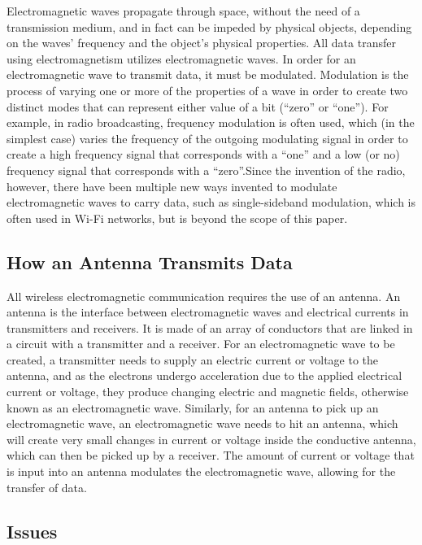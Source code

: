 \documentclass[11pt]{article}
\begin{document}
Electromagnetic waves propagate through space, without the need of a transmission medium, and in fact can be impeded by physical objects, depending on the waves’ frequency and the object's physical properties. 
All data transfer using electromagnetism utilizes electromagnetic waves. In order for an electromagnetic wave to transmit data, it must be modulated. Modulation is the process of varying one or more of the properties of a wave in order to create two distinct modes that can represent either value of a bit (“zero” or “one”). For example, in radio broadcasting, frequency modulation is often used, which (in the simplest case) varies the frequency of the outgoing modulating signal in order to create a high frequency signal that corresponds with a “one” and a low (or no) frequency signal that corresponds with a “zero”.Since the invention of the radio, however, there have been multiple new ways invented to modulate electromagnetic waves to carry data, such as single-sideband modulation, which is often used in Wi-Fi networks, but is beyond the scope of this paper.

\subsection{How an Antenna Transmits Data}

All wireless electromagnetic communication requires the use of an antenna. An antenna is the interface between electromagnetic waves and electrical currents in transmitters and receivers. It is made of an array of conductors that are linked in a circuit with a transmitter and a receiver. For an electromagnetic wave to be created, a transmitter needs to supply an electric current or voltage to the antenna, and as the electrons undergo acceleration due to the applied electrical current or voltage, they produce changing electric and magnetic fields, otherwise known as an electromagnetic wave. Similarly, for an antenna to pick up an electromagnetic wave, an electromagnetic wave needs to hit an antenna, which will create very small changes in current or voltage inside the conductive antenna, which can then be picked up by a receiver. The amount of current or voltage that is input into an antenna modulates the electromagnetic wave, allowing for the transfer of data.

\subsection{Issues}
\end{document}
